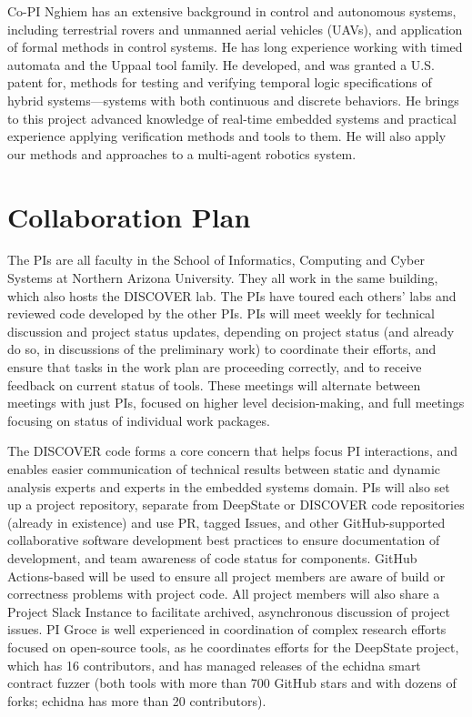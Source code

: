 \documentclass[12pt]{article}
\begin{document}
Co-PI Nghiem has an extensive background in control and autonomous systems, including terrestrial rovers and unmanned aerial vehicles (UAVs), and application of formal methods in control systems.
He has long experience working with timed automata and the Uppaal tool family.
He developed, and was granted a U.S. patent for, methods for testing and verifying temporal logic specifications of hybrid systems---systems with both continuous and discrete behaviors.
He brings to this project advanced knowledge of real-time embedded systems and practical experience applying verification methods and tools to them.
He will also
apply our methods and approaches to a multi-agent robotics system.


\section{Collaboration Plan}

The PIs are all faculty in the School of Informatics, Computing and Cyber Systems at Northern Arizona University.  They all work in the same building, which also hosts the DISCOVER lab.  The PIs have toured each others' labs and reviewed code developed by the other PIs.  PIs will meet weekly for technical discussion and project status updates, depending on project status (and already do so, in discussions of the preliminary work) to coordinate their efforts, and ensure that tasks in the work plan are proceeding correctly, and to receive feedback on current status of tools.  These meetings will alternate between meetings with just PIs, focused on higher level decision-making, and full meetings focusing on status of individual work packages.

The DISCOVER code forms a core concern that helps focus PI interactions, and enables easier communication of technical results between static and dynamic analysis experts and experts in the embedded systems domain.  PIs will also set up a project repository, separate from DeepState or DISCOVER code repositories (already in existence) and use PR, tagged Issues, and other GitHub-supported collaborative software development best practices to ensure documentation of development, and team awareness of code status for components.  GitHub Actions-based will be used to ensure all project members are aware of build or correctness problems with project code.  All project members will also share a Project Slack Instance to facilitate archived, asynchronous discussion of project issues.
PI Groce is well experienced in coordination of complex research efforts focused on open-source tools, as he coordinates efforts for the DeepState project, which has 16 contributors, and has managed releases of the echidna smart contract fuzzer (both tools with more than 700 GitHub stars and with dozens of forks; echidna has more than 20 contributors).
\end{document}
